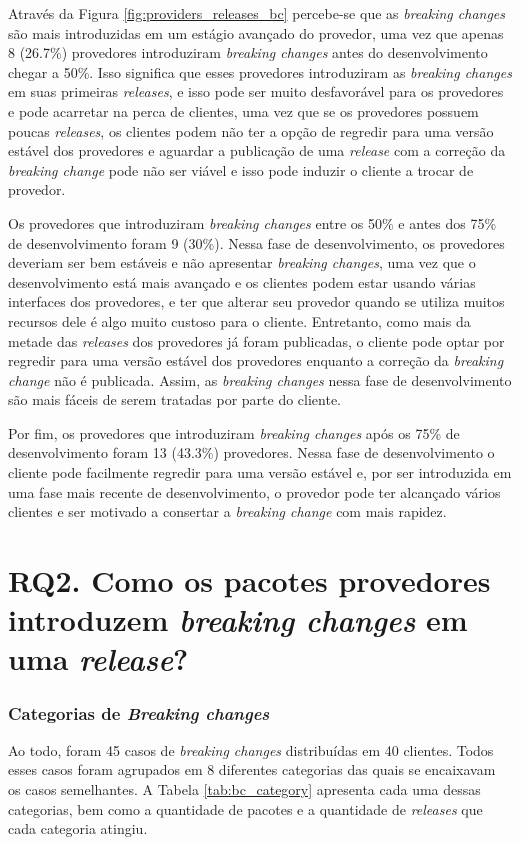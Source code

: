 Através da Figura \ref{fig:providers_releases_bc} percebe-se que as \textit{breaking changes} são mais introduzidas em um estágio avançado do provedor, uma vez que apenas 8 (26.7\%) provedores introduziram \textit{breaking changes} antes do desenvolvimento chegar a 50\%.  Isso significa que esses provedores introduziram as \textit{breaking changes} em suas primeiras \textit{releases}, e isso pode ser muito desfavorável para os provedores e pode acarretar na perca de clientes, uma vez que se os provedores possuem poucas \textit{releases}, os clientes podem não ter a opção de regredir para uma versão estável dos provedores e aguardar a publicação de uma \textit{release} com a correção da \textit{breaking change} pode não ser viável e isso pode induzir o cliente a trocar de provedor.

Os provedores que introduziram \textit{breaking changes} entre os 50\% e antes dos 75\% de desenvolvimento foram 9 (30\%). Nessa fase de desenvolvimento, os provedores deveriam ser bem estáveis e não apresentar \textit{breaking changes}, uma vez que o desenvolvimento está mais avançado e os clientes podem estar usando várias interfaces dos provedores, e ter que alterar seu provedor quando se utiliza muitos recursos dele é algo muito custoso para o cliente. Entretanto, como mais da metade das \textit{releases} dos provedores já foram publicadas, o cliente pode optar por regredir para uma versão estável dos provedores enquanto a correção da \textit{breaking change} não é publicada. Assim, as \textit{breaking changes} nessa fase de desenvolvimento são mais fáceis de serem tratadas por parte do cliente.

Por fim, os provedores que introduziram \textit{breaking changes} após os 75\% de desenvolvimento foram 13 (43.3\%) provedores. Nessa fase de desenvolvimento o cliente pode facilmente regredir para uma versão estável e, por ser introduzida em uma fase mais recente de desenvolvimento, o provedor pode ter alcançado vários clientes e ser motivado a consertar a \textit{breaking change} com mais rapidez.
\section{RQ2. Como os pacotes provedores introduzem \textit{breaking changes} em uma \textit{release}?}
\label{sec:qp2:results}

\subsubsection{Categorias de \textit{Breaking changes}}
Ao todo, foram 45 casos de \textit{breaking changes} distribuídas em 40 clientes. Todos esses casos foram agrupados em 8 diferentes categorias das quais se encaixavam os casos semelhantes. A Tabela \ref{tab:bc_category} apresenta cada uma dessas categorias, bem como a quantidade de pacotes e a quantidade de \textit{releases} que cada categoria atingiu.

